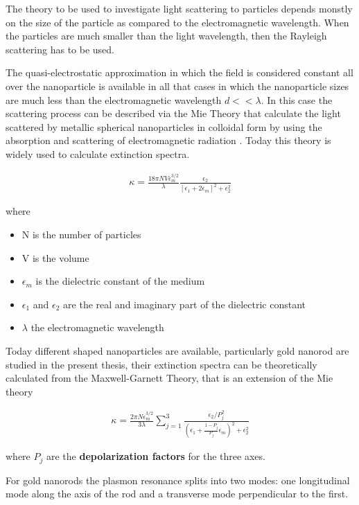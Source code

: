 The theory to be used to investigate light scattering to particles depends monstly on the size of the particle as compared to the electromagnetic wavelength. When the particles are much smaller than the light wavelength, then the Rayleigh scattering has to be used.



The quasi-electrostatic approximation in which the field is considered constant all over the nanoparticle is available in all that cases in which the nanoparticle sizes are much less than the electromagnetic wavelength $d << \lambda $. In this case the scattering process can be described via the Mie Theory that calculate the light scattered by metallic spherical nanoparticles in colloidal form by using the absorption and scattering of electromagnetic radiation \cite{link1999}. Today this theory is widely used to calculate extinction spectra.

\begin{eqnarray}
	\kappa = \frac{18\pi NV\epsilon_m^{3/2}}{\lambda} \frac{\epsilon_2}{ [ \epsilon_1 + 2\epsilon_m]^2 + \epsilon_2^2}
\end{eqnarray}


where
\begin{itemize}
	\item N is the number of particles
	\item V is the volume
	\item $\epsilon_m$ is the dielectric constant of the medium
	\item $\epsilon_1$ and $\epsilon_2$ are the real and imaginary part of the dielectric constant
	\item $\lambda$ the electromagnetic wavelength

\end{itemize}

Today different shaped nanoparticles are available, particularly gold nanorod are studied in the present thesis, their extinction spectra can be theoretically calculated from the Maxwell-Garnett Theory, that is an extension of the Mie theory

\begin{eqnarray}
	\kappa = \frac{2\pi N\epsilon_m^{3/2}}{3\lambda}\sum_{j=1}^3\frac{\epsilon_2/P_j^2}{\left( \epsilon_1 + \frac{1-P_j}{P_j}\epsilon_m \right)^2 + \epsilon_2^2}
\end{eqnarray} 

where $P_j$ are the {\bf depolarization factors} for the three axes.

For gold nanorods the plasmon resonance splits into two modes: one longitudinal mode along the axis of the rod and a transverse mode perpendicular to the first.

